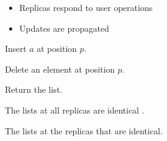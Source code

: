 \begin{frame}{}
  \centerline{\Large {}}
  \vspace{-0.20cm}
  

  \pause
  \vspace{-0.50cm}
  \begin{itemize}
    \centering
    \item Replicas respond to user operations 
    \item Updates are propagated 
  \end{itemize}
\end{frame}

\begin{frame}{}
  \centerline{\Large {}}
  \vspace{0.30cm}

  \begin{center}
    \begin{minipage}{0.70\textwidth}
      \begin{description}
	\setlength{\itemsep}{10pt}
	\item[$\textsc{Ins}(a, p):$] Insert $a$ at position $p$.
	\item[$\textsc{Del}(p):$] Delete an element at position $p$.
	\item[$\textsc{Read}:$] Return the list.
      \end{description}
    \end{minipage}
  \end{center}

  \pause
  \vspace{0.80cm}
  \centerline{\large {}}
\end{frame}

\begin{frame}{}
  \begin{definition}
    The lists at all replicas are identical .
  \end{definition}

  \vspace{-0.30cm}
  \vspace{-0.50cm}

  \begin{definition}
    The lists at the replicas that  are identical.
  \end{definition}

  \pause
  \vspace{0.50cm}
  \centerline{}
\end{frame}


